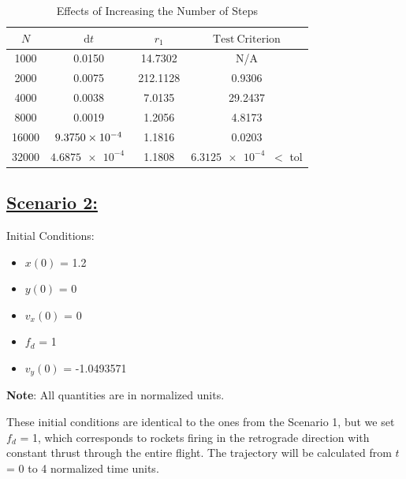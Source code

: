 \documentclass{article}
\newcommand{\cw}{\color{white}}
\begin{document}
\begin{table}[h]
    \centering
    \caption{\cw Effects of Increasing the Number of Steps}
    \begin{tabular}{cccc} \toprule
        {$N$} & {$\mathrm{d}t$}    & {$r_1$}  & {$\mathrm{Test \ Criterion}$}                 \\ \midrule
        1000  & 0.0150             & 14.7302  & N/A                                           \\
        2000  & 0.0075             & 212.1128 & 0.9306                                        \\
        4000  & 0.0038             & 7.0135   & 29.2437                                       \\
        8000  & 0.0019             & 1.2056   & 4.8173                                        \\
        16000 & $\SI{9.3750E-4}{}$ & 1.1816   & 0.0203                                        \\
        32000 & $\SI{4.6875e-4}{}$ & 1.1808   & \color{magenta}$\SI{6.3125e-4}{}$ \cw $<$ tol \\ \bottomrule
    \end{tabular}
    \label{tab:table1}
\end{table}



\pagebreak

\subsection*{\underline{Scenario 2:}}

Initial Conditions:
\begin{multicols}{4}
    \begin{itemize}
        \item $x(0)$ = 1.2
        \item $y(0)$ = 0
        \item $v_x(0)$ = 0
        \item $f_d$ = 1
        \item $v_y(0)$ = -1.0493571
    \end{itemize}
\end{multicols}

\textbf{Note}: All quantities are in normalized units.

\vspace{\baselineskip}

These initial conditions are identical to the ones from the Scenario 1, but we set $f_d$ = 1, which corresponds to rockets firing in the retrograde direction with constant thrust through the entire flight. The trajectory will be calculated from $t$ = 0 to 4 normalized time units.
\end{document}
